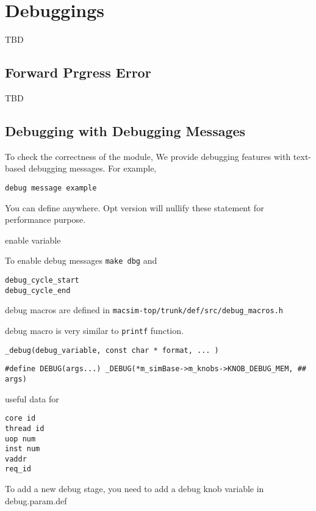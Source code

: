 

\chapter{Debuggings}
\label{sec:debugging}
TBD 
\section{Forward Prgress Error}
TBD 



\section{Debugging with Debugging Messages}

To check the correctness of the module, We provide debugging features
with text-based debugging messages. For example,

\begin{Verbatim}
debug message example
\end{Verbatim}

You can define anywhere. Opt version will nullify these statement for
performance purpose.

enable variable

To enable debug messages \Verb+make dbg+ and 

\begin{Verbatim}
debug_cycle_start
debug_cycle_end
\end{Verbatim}

debug macros are defined in \Verb+macsim-top/trunk/def/src/debug_macros.h+

debug macro is very similar to \Verb+printf+ function.

\begin{Verbatim}
_debug(debug_variable, const char * format, ... )
\end{Verbatim}

\begin{Verbatim}
#define DEBUG(args...) _DEBUG(*m_simBase->m_knobs->KNOB_DEBUG_MEM, ## args)
\end{Verbatim}


useful data for 

\begin{Verbatim}
core id
thread id
uop num
inst num
vaddr
req_id
\end{Verbatim}


To add a new debug stage, you need to add a debug knob variable in debug.param.def



